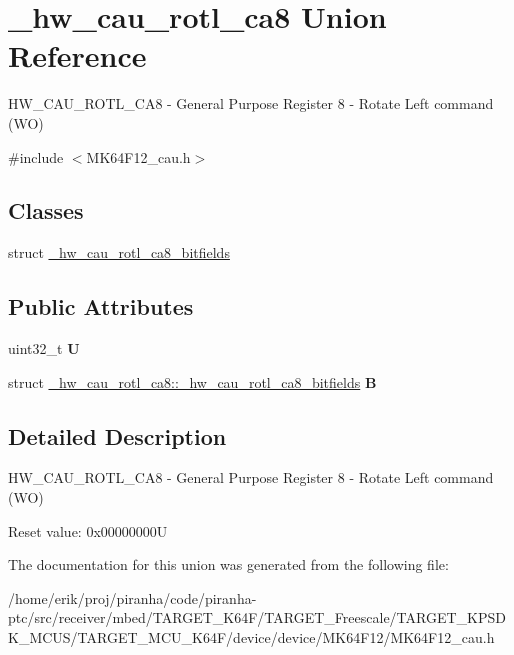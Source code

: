 \hypertarget{union__hw__cau__rotl__ca8}{}\section{\+\_\+hw\+\_\+cau\+\_\+rotl\+\_\+ca8 Union Reference}
\label{union__hw__cau__rotl__ca8}


H\+W\+\_\+\+C\+A\+U\+\_\+\+R\+O\+T\+L\+\_\+\+C\+A8 -\/ General Purpose Register 8 -\/ Rotate Left command (WO)  




{\ttfamily \#include $<$M\+K64\+F12\+\_\+cau.\+h$>$}

\subsection*{Classes}
\begin{DoxyCompactItemize}
\item 
struct \hyperlink{struct__hw__cau__rotl__ca8_1_1__hw__cau__rotl__ca8__bitfields}{\+\_\+hw\+\_\+cau\+\_\+rotl\+\_\+ca8\+\_\+bitfields}
\end{DoxyCompactItemize}
\subsection*{Public Attributes}
\begin{DoxyCompactItemize}
\item 
uint32\+\_\+t {\bfseries U}\hypertarget{union__hw__cau__rotl__ca8_a907fd50b5c2a92a6223288126f110a29}{}\label{union__hw__cau__rotl__ca8_a907fd50b5c2a92a6223288126f110a29}

\item 
struct \hyperlink{struct__hw__cau__rotl__ca8_1_1__hw__cau__rotl__ca8__bitfields}{\+\_\+hw\+\_\+cau\+\_\+rotl\+\_\+ca8\+::\+\_\+hw\+\_\+cau\+\_\+rotl\+\_\+ca8\+\_\+bitfields} {\bfseries B}\hypertarget{union__hw__cau__rotl__ca8_aee9566a232fbb2038eec0f325f482079}{}\label{union__hw__cau__rotl__ca8_aee9566a232fbb2038eec0f325f482079}

\end{DoxyCompactItemize}


\subsection{Detailed Description}
H\+W\+\_\+\+C\+A\+U\+\_\+\+R\+O\+T\+L\+\_\+\+C\+A8 -\/ General Purpose Register 8 -\/ Rotate Left command (WO) 

Reset value\+: 0x00000000U 

The documentation for this union was generated from the following file\+:\begin{DoxyCompactItemize}
\item 
/home/erik/proj/piranha/code/piranha-\/ptc/src/receiver/mbed/\+T\+A\+R\+G\+E\+T\+\_\+\+K64\+F/\+T\+A\+R\+G\+E\+T\+\_\+\+Freescale/\+T\+A\+R\+G\+E\+T\+\_\+\+K\+P\+S\+D\+K\+\_\+\+M\+C\+U\+S/\+T\+A\+R\+G\+E\+T\+\_\+\+M\+C\+U\+\_\+\+K64\+F/device/device/\+M\+K64\+F12/M\+K64\+F12\+\_\+cau.\+h\end{DoxyCompactItemize}
